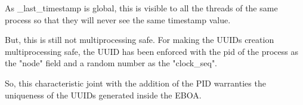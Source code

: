 As \_last\_timestamp is global, this is visible to all the threads of the same process so that they will never see the same timestamp value.

But, this is still not multiprocessing safe. For making the UUIDs creation multiprocessing safe, the UUID has been enforced with the \acrshort{pid} of the process as the "node" field and a random number as the "clock\_seq".

So, this characteristic joint with the addition of the PID warranties the uniqueness of the UUIDs generated inside the EBOA.
